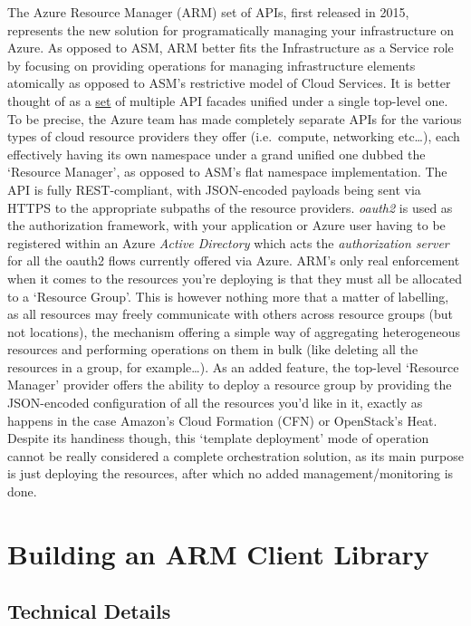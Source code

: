 \documentclass[11pt]{report}
\begin{document}
The Azure Resource Manager (ARM) set of APIs, first released in 2015,
represents the new solution for programatically managing your infrastructure on
Azure. As opposed to ASM, ARM better fits the Infrastructure as a Service
role by focusing on providing operations for managing infrastructure elements
atomically as opposed to ASM's restrictive model of Cloud Services. It is better
thought of as a \underline{set} of multiple API facades unified under a single
top-level one. To be precise, the Azure team has made completely separate APIs
for the various types of cloud resource providers they offer (i.e.\ compute,
networking etc\ldots), each effectively having its own namespace under a grand
unified one dubbed the `Resource Manager', as opposed to ASM's flat namespace
implementation. The API is fully REST-compliant, with JSON-encoded payloads
being sent via HTTPS to the appropriate subpaths of the resource providers.
\textit{oauth2} is used as the authorization framework, with your application
or Azure user having to be registered within an Azure \textit{Active
Directory} which acts the \textit{authorization server} for all the oauth2
flows currently offered via Azure. \newline
ARM's only real enforcement when it comes to the resources you're deploying is
that they must all be allocated to a `Resource Group'. This is however nothing
more that a matter of labelling, as all resources may freely communicate with
others across resource groups (but not locations), the mechanism offering a
simple way of aggregating heterogeneous resources and performing operations on
them in bulk (like deleting all the resources in a group, for example\ldots).
\newline
As an added feature, the top-level `Resource Manager' provider offers the
ability to deploy a resource group by providing the JSON-encoded configuration
of all the resources you'd like in it, exactly as happens in the case Amazon's
Cloud Formation (CFN) or OpenStack's Heat. Despite its handiness though, this
`template deployment' mode of operation cannot be really considered a complete
orchestration solution, as its main purpose is just deploying the resources,
after which no added management/monitoring is done.

\section{Building an ARM Client Library}

\subsection{Technical Details}
\end{document}
